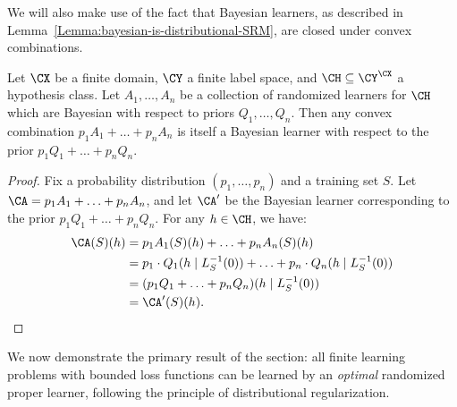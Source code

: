 \documentclass[11pt]{article}
\begin{document}
We will also make use of the fact that Bayesian learners, as described in Lemma~\ref{Lemma:bayesian-is-distributional-SRM}, are closed under convex combinations. 

\begin{lemma}\label{Lemma:convex-combo-of-Bayesian}
Let $\CX$ be a finite domain, $\CY$ a finite label space, and $\CH \subseteq \CY^\CX$ a hypothesis class. Let $A_1, \ldots, A_n$ be a collection of randomized learners for $\CH$ which are Bayesian with respect to priors $Q_1, \ldots, Q_n$. Then any convex combination $p_1 A_1 + \ldots + p_n A_n$ is itself a Bayesian learner with respect to the prior $p_1 Q_1 + \ldots + p_n Q_n$. 
\end{lemma}
\begin{proof}
Fix a probability distribution $(p_1, \ldots, p_n)$ and a training set $S$. Let $\CA = p_1 A_1 + \ldots + p_n A_n$, and let $\CA'$ be the Bayesian learner corresponding to the prior $p_1 Q_1 + \ldots + p_n Q_n$. For any $h \in \CH$, we have:
\begin{align*}
\CA(S)(h) &= p_1 A_1(S)(h) + \ldots + p_n A_n(S) (h) \\
&= p_1 \cdot Q_1(h \mid  L_S^{-1}(0)) + \ldots + p_n \cdot Q_n (h \mid L_S^{-1}(0)) \\
&= (p_1 Q_1 + \ldots + p_n Q_n) (h \mid L_{S}^{-1}(0)) \\
&= \CA'(S)(h). \qedhere
\end{align*}
\end{proof}

We now demonstrate the primary result of the section: all finite learning problems with bounded loss functions can be learned by an \emph{optimal} randomized proper learner, following the principle of distributional regularization. 
\end{document}
